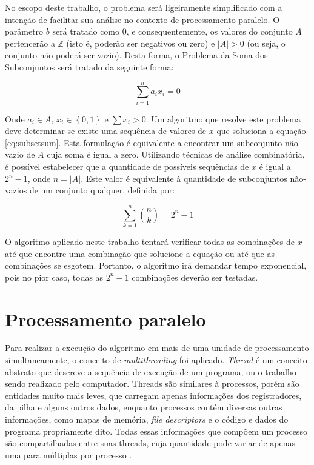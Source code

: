 \documentclass[12pt]{article}
\begin{document}
No escopo deste trabalho, o problema será ligeiramente simplificado com a intenção de facilitar sua análise no contexto de processamento paralelo. O parâmetro $b$ será tratado como 0, e consequentemente, os valores do conjunto $A$ pertencerão a $\mathbb{Z}$ (isto é, poderão ser negativos ou zero) e $\left | A \right | > 0$ (ou seja, o conjunto não poderá ser vazio). Desta forma, o Problema da Soma dos Subconjuntos será tratado da seguinte forma:

\begin{equation} \label{eq:subsetsum}
    \sum_{i = 1}^{n} a_{i} x_{i} = 0
\end{equation}

Onde $a_{i} \in A$, $x_{i} \in \left\{0, 1\right\}$ e $\sum x_{i} > 0$. Um algoritmo que resolve este problema deve determinar se existe uma sequência de valores de $x$ que soluciona a equação \ref{eq:subsetsum}. Esta formulação é equivalente a encontrar um subconjunto não-vazio de $A$ cuja soma é igual a zero. Utilizando técnicas de análise combinatória, é possível estabelecer que a quantidade de possíveis sequências de $x$ é igual a $2^{n} - 1$, onde $n = \left | A \right |$. Este valor é equivalente à quantidade de subconjuntos não-vazios de um conjunto qualquer, definida por:

\begin{equation} \label{eq:subsetcount}
    \sum_{k = 1}^{n} \binom{n}{k} = 2^{n} - 1
\end{equation}

O algoritmo aplicado neste trabalho tentará verificar todas as combinações de $x$ até que encontre uma combinação que solucione a equação ou até que as combinações se esgotem. Portanto, o algoritmo irá demandar tempo exponencial, pois no pior caso, todas as $2^{n} - 1$ combinações deverão ser testadas.

\section{Processamento paralelo} \label{sec:parallel}

Para realizar a execução do algoritmo em mais de uma unidade de processamento simultaneamente, o conceito de \textit{multithreading} foi aplicado. \textit{Thread} é um conceito abstrato que descreve a sequência de execução de um programa, ou o trabalho sendo realizado pelo computador. Threads são similares à processos, porém são entidades muito mais leves, que carregam apenas informações dos registradores, da pilha e alguns outros dados, enquanto processos contém diversas outras informações, como mapas de memória, \textit{file descriptors} e o código e dados do programa propriamente dito. Todas essas informações que compõem um processo são compartilhadas entre suas threads, cuja quantidade pode variar de apenas uma para múltiplas por processo \cite{Lewis1996}.
\end{document}
